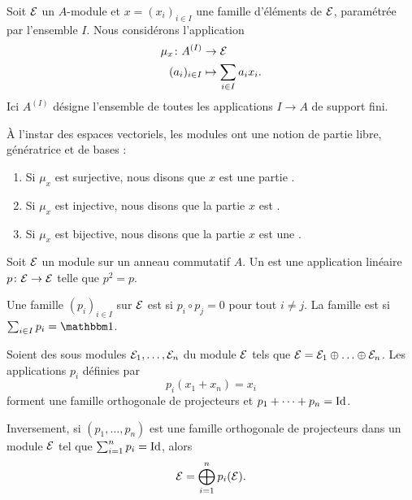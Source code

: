 Soit \( \mathcal{E}\) un \( A\)-module et \( x=(x_i)_{i\in I}\) une famille d'éléments de \( \mathcal{E}\), paramétrée par l'ensemble \( I\). Nous considérons l'application
\begin{equation}
    \begin{aligned}
        \mu_x\colon A^{(I)}&\to \mathcal{E} \\
        (a_i)_{i\in I}&\mapsto \sum_{i\in I}a_ix_i.
    \end{aligned}
\end{equation}
Ici \( A^{(I)}\) désigne l'ensemble de toutes les applications \( I\to A\) de support fini.  

\begin{definition}      \label{DefBasePouyKj}
    À l'instar des espaces vectoriels, les modules ont une notion de partie libre, génératrice et de bases :
    \begin{enumerate}
        \item
            Si \( \mu_x\) est surjective, nous disons que \( x\) est une partie .
        \item
            Si \( \mu_x\) est injective, nous disons que la partie \( x\) est .
        \item
            Si \( \mu_x\) est bijective, nous disons que la partie \( x\) est une .
    \end{enumerate}
\end{definition}

\begin{definition}
    Soit \( \mathcal{E}\) un module sur un anneau commutatif \( A\). Un  est une application linéaire \( p\colon \mathcal{E}\to \mathcal{E}\) telle que \( p^2=p\).

    Une famille \( (p_i)_{i\in I}\) sur \( \mathcal{E}\) est  si \( p_i\circ p_j=0\) pour tout \( i\neq j\). La famille est  si \( \sum_{i\in I}p_i=\mtu\).
\end{definition}

\begin{theorem}     \label{ThoProjModpAlsUR}
    Soient des sous modules \( \mathcal{E}_1,\ldots,\mathcal{E}_n\) du module \( \mathcal{E}\) tels que \( \mathcal{E}=\mathcal{E}_1\oplus\ldots\oplus\mathcal{E}_n\). Les applications \( p_i\) définies par
    \begin{equation}
        p_i(x_1+x_n)=x_i
    \end{equation}
    forment une famille orthogonale de projecteurs et \( p_1+\cdots +p_n=\operatorname{Id}\).

    Inversement, si \( (p_1,\ldots, p_n)\) est une famille orthogonale de projecteurs dans un module \( \mathcal{E}\) tel que \( \sum_{i=1}^np_i=\operatorname{Id}\), alors
    \begin{equation}
        \mathcal{E}=\bigoplus_{i=1}^np_i(\mathcal{E}).
    \end{equation}
\end{theorem}

